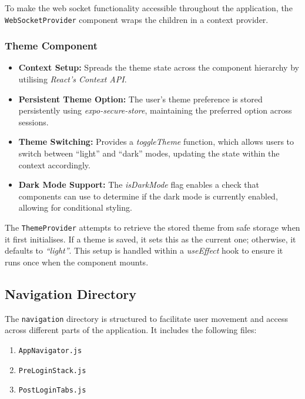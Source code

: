To make the web socket functionality accessible throughout the application, the \texttt{WebSocketProvider} component wraps the children in a context provider.

\subsubsection{Theme Component}

\begin{itemize}
    \item \textbf{Context Setup:} Spreads the theme state across the component hierarchy by utilising \textit{React's Context API}.
    \item \textbf{Persistent Theme Option:} The user's theme preference is stored persistently using \textit{expo-secure-store}, maintaining the preferred option across sessions.
    \item \textbf{Theme Switching:} Provides a \textit{toggleTheme} function, which allows users to switch between ``light'' and ``dark'' modes, updating the state within the context accordingly.
    \item \textbf{Dark Mode Support:} The \textit{isDarkMode} flag enables a check that components can use to determine if the dark mode is currently enabled, allowing for conditional styling.
\end{itemize}

The \texttt{ThemeProvider} attempts to retrieve the stored theme from safe storage when it first initialises. If a theme is saved, it sets this as the current one; otherwise, it defaults to \textit{``light''}. This setup is handled within a \textit{useEffect} hook to ensure it runs once when the component mounts.

\subsection{Navigation Directory}

The \texttt{navigation} directory is structured to facilitate user movement and access across different parts of the application. It includes the following files:

\begin{enumerate}
    \item \texttt{AppNavigator.js}
    \item \texttt{PreLoginStack.js}
    \item \texttt{PostLoginTabs.js}
\end{enumerate}

